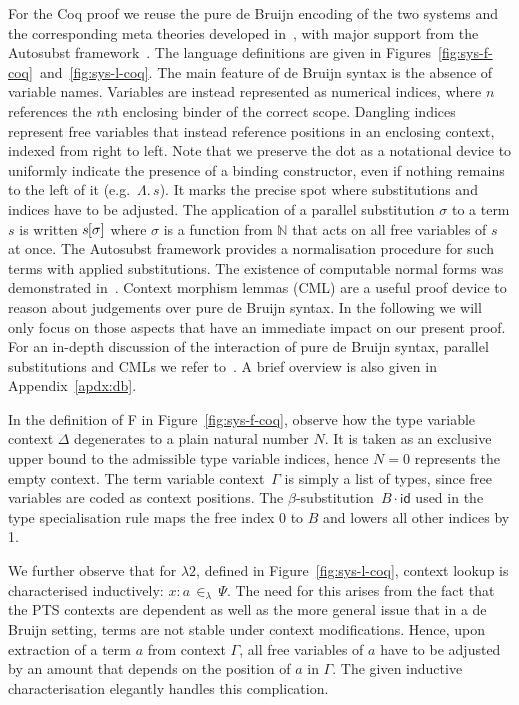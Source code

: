 \documentclass[a4paper,UKenglish]{lipics-v2016}
\newcommand{\ms}{\,}
\newcommand{\mrel}[1]{\mathrel{\ms #1 \ms}}
\newcommand{\Nat}{\mathbb{N}}
\newcommand{\SysL}{$\lambda2$\xspace}
\newcommand{\of}{\ensuremath{\!:\!}}
\newcommand{\inL}{\mrel{\in_{\lambda}}}
\newcommand{\TyLam}{\ensuremath{\Lambda.\,}}
\newcommand{\subst}[1]{\hphantom{|}\!\![{#1}]}
\newcommand{\scons}{\mathbin{\cdot}}
\newcommand{\id}{\mathsf{id}}
\theoremstyle{plain}
\begin{document}
For the Coq proof we reuse the pure de Bruijn encoding of the two systems and the corresponding meta theories developed in~\cite{KaiserEtAl:2017:sysf_pts_equiv_coq}, with major support from the Autosubst framework~\cite{DBLP:conf/itp/SchaferTS15}.
The language definitions are given in Figures~\ref{fig:sys-f-coq}~and~\ref{fig:sys-l-coq}.
The main feature of de Bruijn syntax is the absence of variable names.
Variables are instead represented as numerical indices, where $n$ references the $n$th enclosing binder of the correct scope.
Dangling indices represent free variables that instead reference positions in an enclosing context, indexed from right to left.
Note that we preserve the dot as a notational device to uniformly indicate the presence of a binding constructor, even if nothing remains to the left of it (e.g.\ $\TyLam s$).
It marks the precise spot where substitutions and indices have to be adjusted.
The application of a parallel substitution $\sigma$ to a term $s$ is written $s\subst{\sigma}$ where $\sigma$ is a function from $\Nat$ that acts on all free variables of $s$ at once.
The Autosubst framework provides a normalisation procedure for such terms with applied substitutions.
The existence of computable normal forms was demonstrated in~\cite{SchaeferEtAl:2009:Completeness}.
Context morphism lemmas (CML) are a useful proof device to reason about judgements over pure de Bruijn syntax.
In the following we will only focus on those aspects that have an immediate impact on our present proof.
For an in-depth discussion of the interaction of pure de Bruijn syntax, parallel substitutions and CMLs we refer to~\cite{deBruijn1972, SchaeferEtAl:2009:Completeness, DBLP:conf/itp/SchaferTS15, abadi1991, GoguenMcKinna1997, KaiserEtAl:2017:sysf_pts_equiv_coq}.
A brief overview is also given in Appendix~\ref{apdx:db}.

In the definition of F in Figure~\ref{fig:sys-f-coq}, observe how the type variable context $\Delta$ degenerates to a plain natural number $N$.
It is taken as an exclusive upper bound to the admissible type variable indices, hence $N = 0$ represents the empty context.
The term variable context~$\Gamma$ is simply a list of types, since free variables are coded as context positions.
The $\beta$-substitution~$B\scons{\id}$ used in the type specialisation rule maps the free index 0 to $B$ and lowers all other indices by 1.

We further observe that for \SysL, defined in Figure~\ref{fig:sys-l-coq}, context lookup is characterised inductively: $x \of a \inL \Psi$.
The need for this arises from the fact that the PTS contexts are dependent as well as the more general issue that in a de Bruijn setting, terms are not stable under context modifications.
Hence, upon extraction of a term $a$ from context $\Gamma$, all free variables of $a$ have to be adjusted by an amount that depends on the position of $a$ in $\Gamma$.
The given inductive characterisation elegantly handles this complication.
\end{document}
